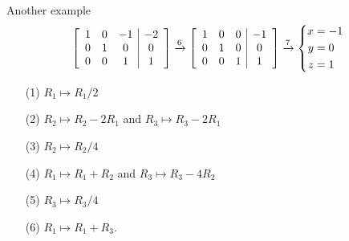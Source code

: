 \documentclass[%
pdf,
neil,
colorBG,
slideColor,
]{prosper}
\begin{document}
\begin{slide}{Another example}
\[ \]
 \[
  \left[\begin{array}{ccc|c}   
   1& 0&-1&-2 \\       
   0& 1& 0& 0 \\       
   0& 0& 1& 1
  \end{array}\right] \xrightarrow{6}
  \left[\begin{array}{ccc|c}   
   1& 0& 0&-1 \\       
   0& 1& 0& 0 \\       
   0& 0& 1& 1
  \end{array}\right] \xrightarrow{7}
  \left\{\begin{aligned}
   x &= -1 \\
   y &= 0 \\
   z &= 1
  \end{aligned}\right.
 \]
 \begin{itemize}
  \item[(1)] $R_1\mapsto R_1/2$
  \item[(2)] $R_2\mapsto R_2-2R_1$ and $R_3\mapsto R_3-2R_1$ 
  \item[(3)] $R_2\mapsto R_2/4$
  \item[(4)] $R_1\mapsto R_1+R_2$ and $R_3\mapsto R_3-4R_2$
  \item[(5)] $R_3\mapsto R_3/4$ 
  \item[(6)] $R_1\mapsto R_1+R_3$.
 \end{itemize}
\end{slide}
\end{document}
